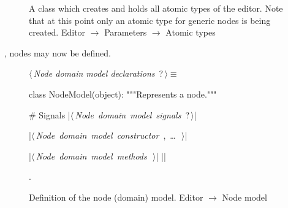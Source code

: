 \documentclass[%
    a4paper,    %
    justified,  %
    nobib,      %
    openany     %
]{tufte-book}
\begin{document}
\begin{figure}
\begin{flushleft}
\begin{minipage}{\linewidth}
\begin{list}{}{\setlength{\itemsep}{-\parsep}\setlength{\itemindent}{-\leftmargin}}
\item{}
\end{list}
\end{minipage}\vspace{4ex}
\end{flushleft}
\caption{A class which creates and holds all atomic types of the editor. Note
  that at this point only an atomic type for generic nodes is being created.
  \newline{}\newline{}Editor $\rightarrow$ Parameters $\rightarrow$ Atomic types}
\label{editor:lst:parameters:atomic-types}
\end{figure}

, nodes may now be defined.

\begin{figure}
\begin{flushleft} \small
\begin{minipage}{\linewidth}\label{scrap66}\raggedright\small
{} $\langle\,${\itshape Node domain model declarations}\nobreak\ {\footnotesize {?}}$\,\rangle\equiv$
\vspace{-1ex}
\begin{pythoncode}
class NodeModel(object):
    """Represents a node."""

    # Signals
    |\hbox{$\langle\,${\itshape Node domain model signals}\nobreak\ {\footnotesize ?}$\,\rangle$}|

    |\hbox{$\langle\,${\itshape Node domain model constructor}\nobreak\ {\footnotesize {}, \ldots\ }$\,\rangle$}|

    |\hbox{$\langle\,${\itshape Node domain model methods}\nobreak\ {\footnotesize {}}$\,\rangle$}|
|\NWsep|
\end{pythoncode}
\vspace{1.5ex}
\footnotesize
\begin{list}{}{\setlength{\itemsep}{-\parsep}\setlength{\itemindent}{-\leftmargin}}
\item {\NWtxtMacroNoRef}.

\item{}
\end{list}
\end{minipage}\vspace{4ex}
\end{flushleft}
\caption{Definition of the node (domain) model.
  \newline{}\newline{}Editor $\rightarrow$ Node model}
\label{editor:lst:node-domain-model}
\end{figure}
\end{document}
